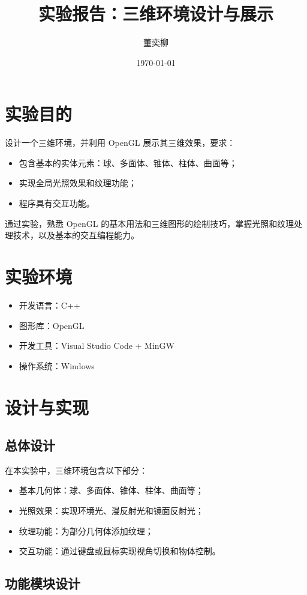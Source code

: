 \documentclass[11pt,a4paper]{article}
\title{实验报告：三维环境设计与展示}
\author{董奕柳}
\date{\today}
\begin{document}
\maketitle

\section{实验目的}
设计一个三维环境，并利用 OpenGL 展示其三维效果，要求：
\begin{itemize}
    \item 包含基本的实体元素：球、多面体、锥体、柱体、曲面等；
    \item 实现全局光照效果和纹理功能；
    \item 程序具有交互功能。
\end{itemize}

通过实验，熟悉 OpenGL 的基本用法和三维图形的绘制技巧，掌握光照和纹理处理技术，以及基本的交互编程能力。

\section{实验环境}
\begin{itemize}
    \item 开发语言：C++
    \item 图形库：OpenGL
    \item 开发工具：Visual Studio Code + MinGW
    \item 操作系统：Windows
\end{itemize}

\section{设计与实现}

\subsection{总体设计}
在本实验中，三维环境包含以下部分：
\begin{itemize}
    \item 基本几何体：球、多面体、锥体、柱体、曲面等；
    \item 光照效果：实现环境光、漫反射光和镜面反射光；
    \item 纹理功能：为部分几何体添加纹理；
    \item 交互功能：通过键盘或鼠标实现视角切换和物体控制。
\end{itemize}

\subsection{功能模块设计}
\end{document}
